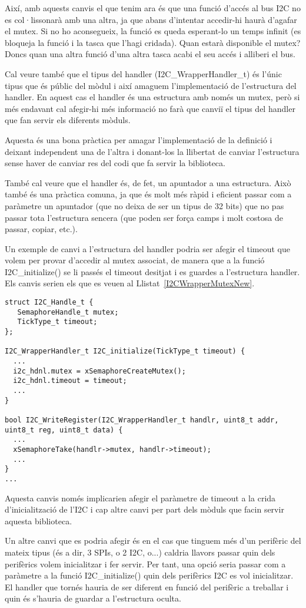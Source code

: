 Així, amb aquests canvis el que tenim ara és que una funció d'accés al bus I2C 
no es col·lissonarà amb una altra, ja que abans d'intentar accedir-hi haurà 
d'agafar el mutex. Si no ho aconsegueix, la funció es queda esperant-lo un temps 
infinit (es bloqueja la funció i la tasca que l'hagi cridada). Quan estarà 
disponible el mutex? Doncs quan una altra funció d'una altra tasca acabi el seu 
accés i alliberi el bus.

Cal veure també que el tipus del handler (I2C\_WrapperHandler\_t) és l'únic tipus 
que és públic del mòdul i així amaguem l'implementació de l'estructura del 
handler. En aquest cas el handler és una estructura amb només un mutex, però si 
més endavant cal afegir-hi més informació no farà que canviï el tipus del 
handler que fan servir els diferents mòduls. 

Aquesta és una bona pràctica per amagar l'implementació de la definició i 
deixant independent una de l'altra i donant-los la llibertat de canviar 
l'estructura sense haver de canviar res del codi que fa servir la biblioteca.

També cal veure que el handler és, de fet, un apuntador a una estructura. Això 
també és una pràctica comuna, ja que és molt més ràpid i eficient passar com a 
paràmetre un apuntador (que no deixa de ser un tipus de 32 bits) que no pas 
passar tota l'estructura sencera (que poden ser força camps i molt costosa de 
passar, copiar, etc.).

Un exemple de canvi a l'estructura del handler podria ser afegir el timeout que 
volem per provar d'accedir al mutex associat, de manera que a la funció 
I2C\_initialize() se li passés el timeout desitjat i es guardes a l'estructura 
handler. Els canvis serien els que es veuen al Llistat~\ref{I2CWrapperMutexNew}.

\begin{lstlisting}[style=customc, label=I2CWrapperMutexNew, caption=Afegint més dades a l 'estructura del {\em wrapper} I2C amb mutex]
struct I2C_Handle_t {
   SemaphoreHandle_t mutex;
   TickType_t timeout;
};

I2C_WrapperHandler_t I2C_initialize(TickType_t timeout) {
  ...
  i2c_hdnl.mutex = xSemaphoreCreateMutex();
  i2c_hdnl.timeout = timeout;
  ...
}

bool I2C_WriteRegister(I2C_WrapperHandler_t handlr, uint8_t addr, uint8_t reg, uint8_t data) {
  ...
  xSemaphoreTake(handlr->mutex, handlr->timeout);
  ...
}
... 
\end{lstlisting}

Aquesta canvis només implicarien afegir el paràmetre de timeout a la crida 
d'inicialització de l'I2C i cap altre canvi per part dels mòduls que facin 
servir aquesta biblioteca.

Un altre canvi que es podria afegir és en el cas que tinguem més d'un perifèric 
del mateix tipus (és a dir, 3 SPIs, o 2 I2C, o...) caldria llavors passar quin 
dels perifèrics volem inicialitzar i fer servir. Per tant, una opció seria 
passar com a paràmetre a la funció I2C\_initialize() quin dels perifèrics I2C es 
vol inicialitzar. El handler que tornés hauria de ser diferent en funció del 
perifèric a treballar i quin és s'hauria de guardar a l'estructura oculta.

